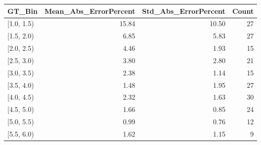 \begin{tabular}{lrrr}
\toprule
GT_Bin & Mean_Abs_ErrorPercent & Std_Abs_ErrorPercent & Count \\
\midrule
[1.0, 1.5) & 15.84 & 10.50 & 27 \\
[1.5, 2.0) & 6.85 & 5.83 & 27 \\
[2.0, 2.5) & 4.46 & 1.93 & 15 \\
[2.5, 3.0) & 3.80 & 2.80 & 21 \\
[3.0, 3.5) & 2.38 & 1.14 & 15 \\
[3.5, 4.0) & 1.48 & 1.95 & 27 \\
[4.0, 4.5) & 2.32 & 1.63 & 30 \\
[4.5, 5.0) & 1.66 & 0.85 & 24 \\
[5.0, 5.5) & 0.99 & 0.76 & 12 \\
[5.5, 6.0) & 1.62 & 1.15 & 9 \\
\bottomrule
\end{tabular}
